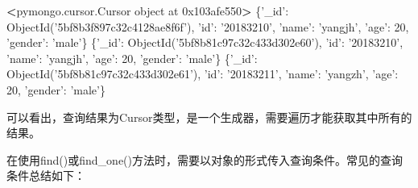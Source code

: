 \documentclass[]{ctexbook}
\newenvironment{Shaded}{\begin{snugshade}}{\end{snugshade}}
\newcommand{\ExtensionTok}[1]{#1}
\newcommand{\NormalTok}[1]{#1}
\newcommand{\OperatorTok}[1]{\textcolor[rgb]{0.81,0.36,0.00}{\textbf{#1}}}
\newcommand{\StringTok}[1]{\textcolor[rgb]{0.31,0.60,0.02}{#1}}
\begin{document}
\begin{Shaded}
\begin{Highlighting}[]
\OperatorTok{<}\ExtensionTok{pymongo.cursor.Cursor}\NormalTok{ object at 0x103afe550}\OperatorTok{>}
\NormalTok{\{}\StringTok{'_id'}\NormalTok{: }\ExtensionTok{ObjectId}\NormalTok{(}\StringTok{'5bf8b3f897c32c4128ae8f6f'}\NormalTok{), }\StringTok{'id'}\NormalTok{: }\StringTok{'20183210'}\NormalTok{, }\StringTok{'name'}\NormalTok{: }\StringTok{'yangjh'}\NormalTok{, }\StringTok{'age'}\NormalTok{: }\ExtensionTok{20}\NormalTok{, }\StringTok{'gender'}\NormalTok{: }\StringTok{'male'}\NormalTok{\}}
\NormalTok{\{}\StringTok{'_id'}\NormalTok{: }\ExtensionTok{ObjectId}\NormalTok{(}\StringTok{'5bf8b81c97c32c433d302e60'}\NormalTok{), }\StringTok{'id'}\NormalTok{: }\StringTok{'20183210'}\NormalTok{, }\StringTok{'name'}\NormalTok{: }\StringTok{'yangjh'}\NormalTok{, }\StringTok{'age'}\NormalTok{: }\ExtensionTok{20}\NormalTok{, }\StringTok{'gender'}\NormalTok{: }\StringTok{'male'}\NormalTok{\}}
\NormalTok{\{}\StringTok{'_id'}\NormalTok{: }\ExtensionTok{ObjectId}\NormalTok{(}\StringTok{'5bf8b81c97c32c433d302e61'}\NormalTok{), }\StringTok{'id'}\NormalTok{: }\StringTok{'20183211'}\NormalTok{, }\StringTok{'name'}\NormalTok{: }\StringTok{'yangzh'}\NormalTok{, }\StringTok{'age'}\NormalTok{: }\ExtensionTok{20}\NormalTok{, }\StringTok{'gender'}\NormalTok{: }\StringTok{'male'}\NormalTok{\}}
\end{Highlighting}
\end{Shaded}

可以看出，查询结果为Cursor类型，是一个生成器，需要遍历才能获取其中所有的结果。

在使用find()或find\_one()方法时，需要以对象的形式传入查询条件。常见的查询条件总结如下：
\end{document}

